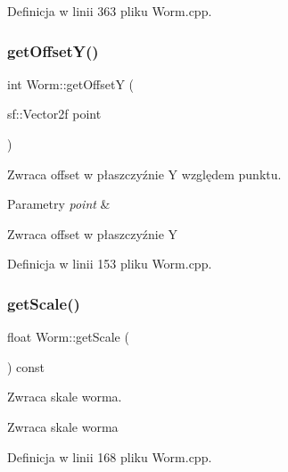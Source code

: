 Definicja w linii 363 pliku Worm.\+cpp.

\mbox{\label{class_worm_a5a9fb6f1859a7b5cf6c447ea3ae0c1e5}} 
\subsubsection{\texorpdfstring{get\+Offset\+Y()}{getOffsetY()}}
{\footnotesize\ttfamily int Worm\+::get\+OffsetY (\begin{DoxyParamCaption}\item[{sf\+::\+Vector2f}]{point }\end{DoxyParamCaption})}



Zwraca offset w płaszczyźnie Y względem punktu. 


\begin{DoxyParams}{Parametry}
{\em point} & \\
\hline
\end{DoxyParams}
\begin{DoxyReturn}{Zwraca}
offset w płaszczyźnie Y 
\end{DoxyReturn}


Definicja w linii 153 pliku Worm.\+cpp.

\mbox{\label{class_worm_a72cf5070503bcba6423773de3367cdfd}} 
\subsubsection{\texorpdfstring{get\+Scale()}{getScale()}}
{\footnotesize\ttfamily float Worm\+::get\+Scale (\begin{DoxyParamCaption}{ }\end{DoxyParamCaption}) const}



Zwraca skale worma. 

\begin{DoxyReturn}{Zwraca}
skale worma 
\end{DoxyReturn}


Definicja w linii 168 pliku Worm.\+cpp.

\mbox{\label{class_worm_a9b314b9a4bb91830aac7f616ef071c07}} 
